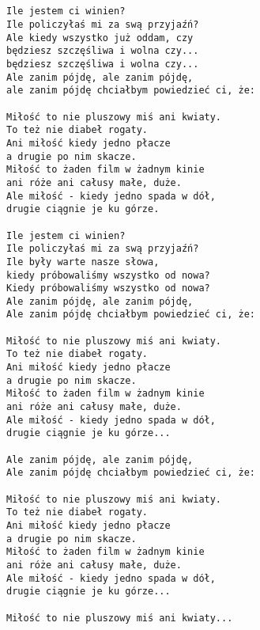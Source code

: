 \documentclass[12pt]{article}
\begin{document}
\subsection*{}
\begin{verbatim}
Ile jestem ci winien?
Ile policzyłaś mi za swą przyjaźń?
Ale kiedy wszystko już oddam, czy
będziesz szczęśliwa i wolna czy...
będziesz szczęśliwa i wolna czy...
Ale zanim pójdę, ale zanim pójdę,
ale zanim pójdę chciałbym powiedzieć ci, że:

Miłość to nie pluszowy miś ani kwiaty.
To też nie diabeł rogaty.
Ani miłość kiedy jedno płacze
a drugie po nim skacze.
Miłość to żaden film w żadnym kinie
ani róże ani całusy małe, duże.
Ale miłość - kiedy jedno spada w dół,
drugie ciągnie je ku górze.

Ile jestem ci winien?
Ile policzyłaś mi za swą przyjaźń?
Ile były warte nasze słowa,
kiedy próbowaliśmy wszystko od nowa?
Kiedy próbowaliśmy wszystko od nowa?
Ale zanim pójdę, ale zanim pójdę,
Ale zanim pójdę chciałbym powiedzieć ci, że:

Miłość to nie pluszowy miś ani kwiaty.
To też nie diabeł rogaty.
Ani miłość kiedy jedno płacze
a drugie po nim skacze.
Miłość to żaden film w żadnym kinie
ani róże ani całusy małe, duże.
Ale miłość - kiedy jedno spada w dół,
drugie ciągnie je ku górze...

Ale zanim pójdę, ale zanim pójdę,
Ale zanim pójdę chciałbym powiedzieć ci, że:

Miłość to nie pluszowy miś ani kwiaty.
To też nie diabeł rogaty.
Ani miłość kiedy jedno płacze
a drugie po nim skacze.
Miłość to żaden film w żadnym kinie
ani róże ani całusy małe, duże.
Ale miłość - kiedy jedno spada w dół,
drugie ciągnie je ku górze...

Miłość to nie pluszowy miś ani kwiaty...
\end{verbatim}
\clearpage
\end{document}
